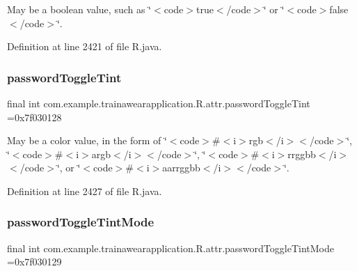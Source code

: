 May be a boolean value, such as \char`\"{}$<$code$>$true$<$/code$>$\char`\"{} or \char`\"{}$<$code$>$false$<$/code$>$\char`\"{}. 

Definition at line 2421 of file R.\+java.

\mbox{\label{classcom_1_1example_1_1trainawearapplication_1_1_r_1_1attr_ad6f23b93451bdf912f87deeffd37a0a5}} 
\subsubsection{\texorpdfstring{passwordToggleTint}{passwordToggleTint}}
{\footnotesize\ttfamily final int com.\+example.\+trainawearapplication.\+R.\+attr.\+password\+Toggle\+Tint =0x7f030128\hspace{0.3cm}{\ttfamily [static]}}

May be a color value, in the form of \char`\"{}$<$code$>$\#$<$i$>$rgb$<$/i$>$$<$/code$>$\char`\"{}, \char`\"{}$<$code$>$\#$<$i$>$argb$<$/i$>$$<$/code$>$\char`\"{}, \char`\"{}$<$code$>$\#$<$i$>$rrggbb$<$/i$>$$<$/code$>$\char`\"{}, or \char`\"{}$<$code$>$\#$<$i$>$aarrggbb$<$/i$>$$<$/code$>$\char`\"{}. 

Definition at line 2427 of file R.\+java.

\mbox{\label{classcom_1_1example_1_1trainawearapplication_1_1_r_1_1attr_adf540dc55d652d0bbfb3fc17d3c547c4}} 
\subsubsection{\texorpdfstring{passwordToggleTintMode}{passwordToggleTintMode}}
{\footnotesize\ttfamily final int com.\+example.\+trainawearapplication.\+R.\+attr.\+password\+Toggle\+Tint\+Mode =0x7f030129\hspace{0.3cm}{\ttfamily [static]}}

